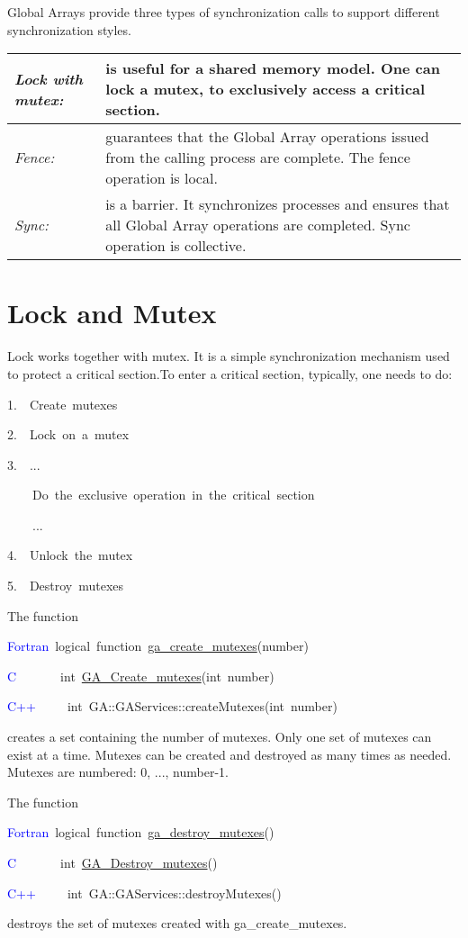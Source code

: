 Global Arrays provide three types of synchronization calls to support
different synchronization styles. 

\begin{tabular}{|>{\centering}p{3cm}|>{\raggedright}p{6cm}|}
\hline 
\emph{Lock with mutex:}  & is useful for a shared memory model. One can lock a mutex, to exclusively
access a critical section. \tabularnewline
\hline 
\emph{Fence:}  & guarantees that the Global Array operations issued from the calling
process are complete. The fence operation is local. \tabularnewline
\hline 
\emph{Sync:}  & is a barrier. It synchronizes processes and ensures that all Global
Array operations are completed. Sync operation is collective. \tabularnewline
\hline
\end{tabular}


\section{Lock and Mutex }

Lock works together with mutex. It is a simple synchronization mechanism
used to protect a critical section.To enter a critical section, typically,
one needs to do:
\begin{lyxcode}
1.~~Create~mutexes~

2.~~Lock~on~a~mutex~

3.~~...~

~~~~Do~the~exclusive~operation~in~the~critical~section~~

~~~~...~

4.~~Unlock~the~mutex~

5.~~Destroy~mutexes
\end{lyxcode}
The function
\begin{lyxcode}
\textcolor{blue}{Fortran}~logical~function~\href{http://www.emsl.pnl.gov/docs/global/ga_ops.html\#ga_create_mutex}{ga\_{}create\_{}mutexes}(number)~

\textcolor{blue}{C}~~~~~~~int~\href{http://www.emsl.pnl.gov/docs/global/c_nga_ops.html\#ga_create_mutexes}{GA\_{}Create\_{}mutexes}(int~number)~

\textcolor{blue}{C++~}~~~~int~GA::GAServices::createMutexes(int~number)
\end{lyxcode}
creates a set containing the number of mutexes. Only one set of mutexes
can exist at a time. Mutexes can be created and destroyed as many
times as needed. Mutexes are numbered: 0, ..., number-1.

The function
\begin{lyxcode}
\textcolor{blue}{Fortran}~logical~function~\href{http://www.emsl.pnl.gov/docs/global/ga_ops.html\#ga_destroy_mutex}{ga\_{}destroy\_{}mutexes}()~

\textcolor{blue}{C}~~~~~~~int~\href{http://www.emsl.pnl.gov/docs/global/c_nga_ops.html\#ga_destroy_mutexes}{GA\_{}Destroy\_{}mutexes}()

\textcolor{blue}{C++}~~~~~int~GA::GAServices::destroyMutexes()
\end{lyxcode}
destroys the set of mutexes created with ga\_create\_mutexes.

